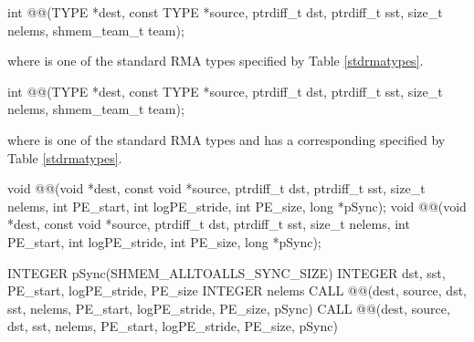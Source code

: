 
\begin{apidefinition}

{\color{Green}
\begin{C11synopsis}
int @@(TYPE *dest, const TYPE *source, ptrdiff_t dst, ptrdiff_t sst, size_t nelems, shmem_team_t team);
\end{C11synopsis}
where \TYPE{} is one of the standard \ac{RMA} types specified by Table
\ref{stdrmatypes}.
}

{\color{Green}
\begin{Csynopsis}
int @@(TYPE *dest, const TYPE *source, ptrdiff_t dst, ptrdiff_t sst, size_t nelems, shmem_team_t team);
\end{Csynopsis}
where \TYPE{} is one of the standard \ac{RMA} types and has a corresponding
\TYPENAME{} specified by Table \ref{stdrmatypes}.
}

\begin{DeprecateBlock}
\begin{CsynopsisCol}
void @@(void *dest, const void *source, ptrdiff_t dst, ptrdiff_t sst, size_t nelems, int PE_start, int logPE_stride, int PE_size, long *pSync);
void @@(void *dest, const void *source, ptrdiff_t dst, ptrdiff_t sst, size_t nelems, int PE_start, int logPE_stride, int PE_size, long *pSync);
\end{CsynopsisCol}
\end{DeprecateBlock}

\begin{Fsynopsis}
INTEGER pSync(SHMEM_ALLTOALLS_SYNC_SIZE)
INTEGER dst, sst, PE_start, logPE_stride, PE_size
INTEGER nelems 
CALL @@(dest, source, dst, sst, nelems, PE_start, logPE_stride, PE_size, pSync)
CALL @@(dest, source, dst, sst, nelems, PE_start, logPE_stride, PE_size, pSync)
\end{Fsynopsis}

\begin{apiarguments}


\end{apiarguments}
\end{apidefinition}
